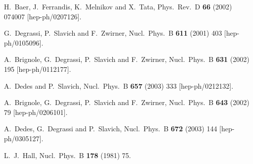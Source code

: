 \documentclass[final,3p,11pt,pdflatex]{elsarticle}
\begin{document}
\begin{thebibliography}{100}
  H.~Baer, J.~Ferrandis, K.~Melnikov and X.~Tata,
  Phys.\ Rev.\ D {\bf 66} (2002) 074007
  [hep-ph/0207126].

  G.~Degrassi, P.~Slavich and F.~Zwirner,
  Nucl.\ Phys.\ B {\bf 611} (2001) 403
  [hep-ph/0105096].

  A.~Brignole, G.~Degrassi, P.~Slavich and F.~Zwirner,
  Nucl.\ Phys.\ B {\bf 631} (2002) 195
  [hep-ph/0112177].

  A.~Dedes and P.~Slavich,
  Nucl.\ Phys.\ B {\bf 657} (2003) 333
  [hep-ph/0212132].

  A.~Brignole, G.~Degrassi, P.~Slavich and F.~Zwirner,
  Nucl.\ Phys.\ B {\bf 643} (2002) 79
  [hep-ph/0206101].

  A.~Dedes, G.~Degrassi and P.~Slavich,
  Nucl.\ Phys.\ B {\bf 672} (2003) 144
  [hep-ph/0305127].

  L.~J.~Hall,
  Nucl.\ Phys.\ B {\bf 178} (1981) 75.

\end{thebibliography}
\end{document}
